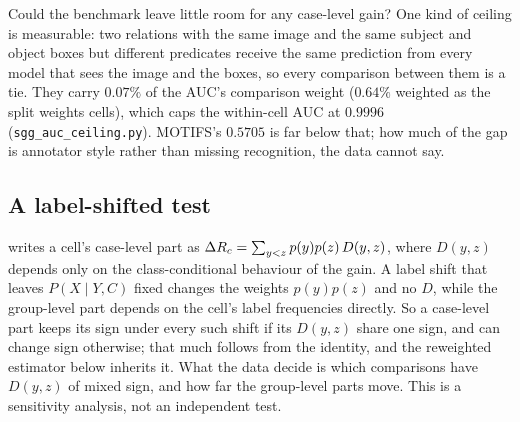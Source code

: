 Could the benchmark leave little room for any case-level gain? One kind of ceiling is
measurable: two relations with the same image and the same subject and object boxes but
different predicates receive the same prediction from every model that sees the image and the
boxes, so every comparison between them is a tie. They carry $0.07\%$ of the AUC's comparison
weight ($0.64\%$ weighted as the split weights cells), which caps the within-cell AUC at
$0.9996$ (\texttt{sgg\_auc\_ceiling.py}). MOTIFS's $0.5705$ is far below that; how much of
the gap is annotator style rather than missing recognition, the data cannot say.

\begin{table}[t]
\centering
\footnotesize
\setlength\tabcolsep{3pt}
\caption{\textbf{The audit after merging predicates} (number of classes in brackets). Matched
quadratic case-level part on the audit half, on all relations and on single-annotation box
pairs; within-cell AUC change; mean recall@50 split (graph constraint) with its
image-clustered case-level interval. Every row is against the MOTIFS baseline.}
\label{tab:merge}

\end{table}

\subsection{A label-shifted test}\label{app:labelshift}

 writes a cell's case-level part as $\Delta R_c=\sum_{y<z}p(y)p(z)\,D(y,z)$, where
$D(y,z)$ depends only on the class-conditional behaviour of the gain. A label shift that leaves
$P(X\mid Y,C)$ fixed changes the weights $p(y)p(z)$ and no $D$, while the group-level part
depends on the cell's label frequencies directly. So a case-level part keeps its sign under
every such shift if its $D(y,z)$ share one sign, and can change sign otherwise; that much
follows from the identity, and the reweighted estimator below inherits it. What the data
decide is which comparisons have $D(y,z)$ of mixed sign, and how far the group-level parts
move. This is a sensitivity analysis, not an independent test.

